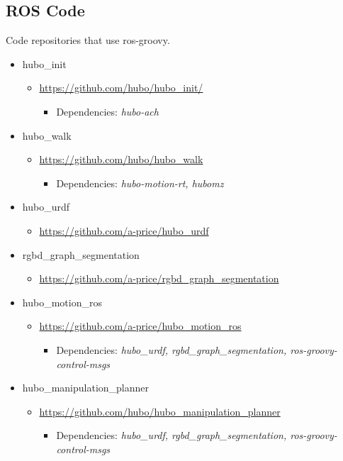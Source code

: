 \documentclass[letterpaper, 10 pt]{report}
\begin{document}
\subsection*{ROS Code}
Code repositories that use ros-groovy.
\begin{itemize}
\item hubo\_init
  \begin{itemize}
	\item \url{https://github.com/hubo/hubo\_init/}
	  \begin{itemize}
	    \item Dependencies: \textit{hubo-ach}
	  \end{itemize}
  \end{itemize}
\item hubo\_walk
  \begin{itemize}
	\item \url{https://github.com/hubo/hubo\_walk}
	  \begin{itemize}
	    \item Dependencies: \textit{hubo-motion-rt, hubomz}
	  \end{itemize}
  \end{itemize}
\item hubo\_urdf
  \begin{itemize}
    \item \url{https://github.com/a-price/hubo\_urdf}
  \end{itemize}
\item rgbd\_graph\_segmentation
  \begin{itemize}
    \item \url{https://github.com/a-price/rgbd\_graph\_segmentation}
  \end{itemize}
\item hubo\_motion\_ros
  \begin{itemize}
	\item \url{https://github.com/a-price/hubo\_motion\_ros}
	  \begin{itemize}
	    \item Dependencies: \textit{hubo\_urdf, rgbd\_graph\_segmentation, ros-groovy-control-msgs}
	  \end{itemize}
  \end{itemize}
\item hubo\_manipulation\_planner
  \begin{itemize}
	\item \url{https://github.com/hubo/hubo\_manipulation\_planner}
	  \begin{itemize}
	    \item Dependencies: \textit{hubo\_urdf, rgbd\_graph\_segmentation, ros-groovy-control-msgs}
	  \end{itemize}
  \end{itemize}
\end{itemize}
\newpage
\end{document}

